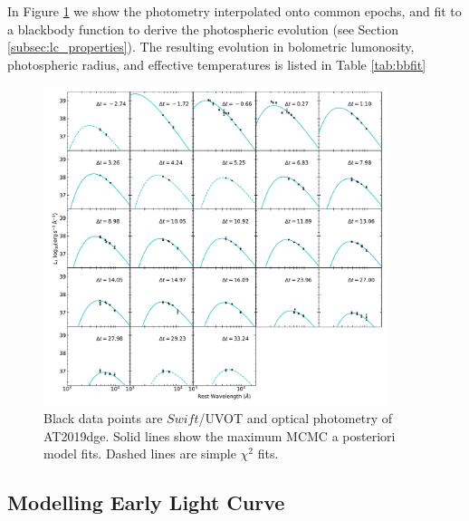 \documentclass[twocolumn]{aastex63}
\begin{document}
\begin{CJK*}{UTF8}{gbsn}
In Figure \ref{fig:seds} we show the photometry interpolated onto common epochs, and fit to a 
blackbody function to derive the photospheric evolution (see Section \ref{subsec:lc_properties}). The 
resulting evolution in bolometric lumonosity, photospheric radius, and effective temperatures is listed 
in Table  \ref{tab:bbfit}
\begin{figure}
    \centering
    \includegraphics[width = 0.9\textwidth]{figures/seds.pdf}
    \caption{Black data points are $Swift$/UVOT and optical photometry of AT2019dge. Solid lines show 
    the maximum MCMC a posteriori model fits. Dashed lines are simple $\chi^2$ fits. 
    \label{fig:seds}}
\end{figure}


\subsection{Modelling Early Light Curve} \label{subsec:p15fit}



\end{CJK*}
\end{document}
